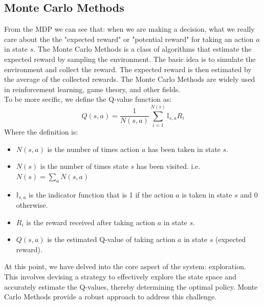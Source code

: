 \documentclass[11pt]{article}
\theoremstyle{definitionstyle}
\begin{document}
\subsection{Monte Carlo Methods}
From the MDP we can see that: when we are making a decision, what we really care about the the "expected reward" or "potential reward" for taking an action $a$ in state $s$. The Monte Carlo Methods is a class of algorithms that estimate the expected reward by sampling the environment. The basic idea is to simulate the environment and collect the reward. The expected reward is then estimated by the average of the collected rewards. The Monte Carlo Methods are widely used in reinforcement learning, game theory, and other fields.\\
To be more secific, we define the Q-value function as:
\[
    Q(s,a)=\frac{1}{N(s,a)}\sum_{i=1}^{N(s)}\mathbb{I}_{s,a}R_i
\] 
Where the definition is:
\begin{itemize}
    \item $N(s,a)$ is the number of times action $a$ has been taken in state $s$.
    \item $N(s)$ is the number of times state $s$ has been visited. i.e. $N(s)=\sum_a N(s,a)$
    \item $\mathbb{I}_{s,a}$ is the indicator function that is 1 if the action $a$ is taken in state $s$ and 0 otherwise.
    \item $R_i$ is the reward received after taking action $a$ in state $s$.
    \item $Q(s,a)$ is the estimated Q-value of taking action $a$ in state $s$ (expected reward).
\end{itemize}
At this point, we have delved into the core aspect of the system: exploration. This involves devising a strategy to effectively explore the state space and accurately estimate the Q-values, thereby determining the optimal policy. Monte Carlo Methods provide a robust approach to address this challenge.
\end{document}
